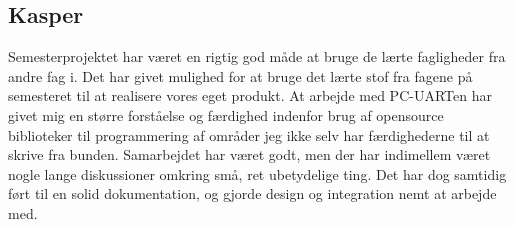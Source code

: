\subsection{Kasper}
Semesterprojektet har været en rigtig god måde at bruge de lærte fagligheder fra andre fag i. Det har givet mulighed for at bruge det lærte stof fra fagene på semesteret til at realisere vores eget produkt. At arbejde med PC-UARTen har givet mig en større forståelse og færdighed indenfor brug af opensource biblioteker til programmering af områder jeg ikke selv har færdighederne til at skrive fra bunden.
Samarbejdet har været godt, men der har indimellem været nogle lange diskussioner omkring små, ret ubetydelige ting. Det har dog samtidig ført til en solid dokumentation, og gjorde design og integration nemt at arbejde med. 